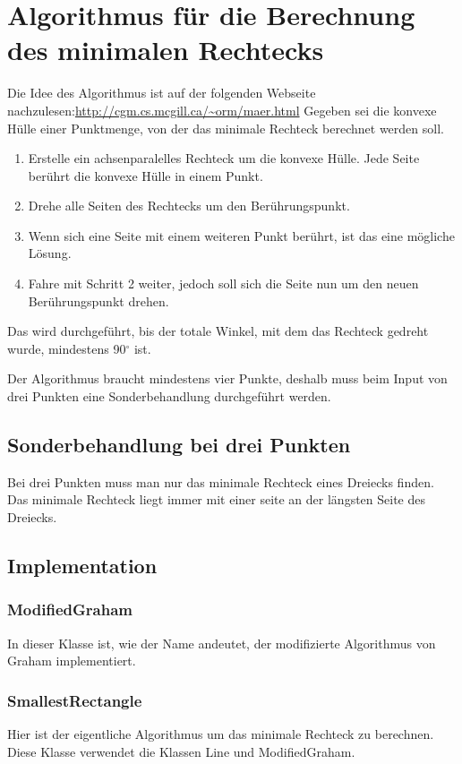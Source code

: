 \documentclass[10pt]{article}
\begin{document}
\section{Algorithmus für die Berechnung des minimalen Rechtecks}
Die Idee des Algorithmus ist auf der folgenden Webseite nachzulesen:\newline \url{http://cgm.cs.mcgill.ca/~orm/maer.html} \newline
Gegeben sei die konvexe Hülle einer Punktmenge, von der das minimale Rechteck berechnet werden soll.
\begin{enumerate}
	\item Erstelle ein achsenparalelles Rechteck um die konvexe Hülle. Jede Seite berührt die konvexe Hülle in einem Punkt.
	\item Drehe alle Seiten des Rechtecks um den Berührungspunkt.
	\item Wenn sich eine Seite mit einem weiteren Punkt berührt, ist das eine mögliche Lösung.
	\item Fahre mit Schritt 2 weiter, jedoch soll sich die Seite nun um den neuen Berührungspunkt drehen.
\end{enumerate}
Das wird durchgeführt, bis der totale Winkel, mit dem das Rechteck gedreht wurde, mindestens 90$^\circ$ ist.

Der Algorithmus braucht mindestens vier Punkte, deshalb muss beim Input von drei Punkten eine Sonderbehandlung durchgeführt werden.

\subsection{Sonderbehandlung bei drei Punkten}
Bei drei Punkten muss man nur das minimale Rechteck eines Dreiecks finden. Das minimale Rechteck liegt immer mit einer seite an der längsten Seite des Dreiecks.

\subsection{Implementation}
\subsubsection{ModifiedGraham}
In dieser Klasse ist, wie der Name andeutet, der modifizierte Algorithmus von Graham implementiert. 
\subsubsection{SmallestRectangle}
Hier ist der eigentliche Algorithmus um das minimale Rechteck zu berechnen. Diese Klasse verwendet die Klassen Line und ModifiedGraham.
\end{document}
